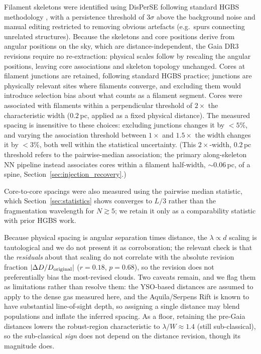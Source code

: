 \documentclass[usenatbib,twoside,twocolumn]{mnras}
\begin{document}
Filament skeletons were identified using DisPerSE \citep{Sousbie2011} following standard HGBS methodology \citep{Arzoumanian2011}, with a persistence threshold of $3\sigma$ above the background noise and manual editing restricted to removing obvious artefacts (e.g.\ spurs connecting unrelated structures). Because the skeletons and core positions derive from angular positions on the sky, which are distance-independent, the Gaia DR3 revisions require no re-extraction: physical scales follow by rescaling the angular positions, leaving core associations and skeleton topology unchanged. Cores at filament junctions are retained, following standard HGBS practice; junctions are physically relevant sites where filaments converge, and excluding them would introduce selection bias about what counts as a filament segment. Cores were associated with filaments within a perpendicular threshold of $2\times$ the characteristic width ($0.2$\,pc, applied as a fixed physical distance). The measured spacing is insensitive to these choices: excluding junctions changes it by $<5\%$, and varying the association threshold between $1\times$ and $1.5\times$ the width changes it by $<3\%$, both well within the statistical uncertainty. (This $2\times$-width, $0.2$\,pc threshold refers to the pairwise-median association; the primary along-skeleton NN pipeline instead associates cores within a filament half-width, $\sim0.06$\,pc, of a spine, Section~\ref{sec:injection_recovery}.)

Core-to-core spacings were also measured using the pairwise median statistic, which Section~\ref{sec:statistics} shows converges to $L/3$ rather than the fragmentation wavelength for $N\gtrsim5$; we retain it only as a comparability statistic with prior HGBS work.

Because physical spacing is angular separation times distance, the $\lambda\propto d$ scaling is tautological and we do not present it as corroboration; the relevant check is that the \emph{residuals} about that scaling do not correlate with the absolute revision fraction $|\Delta D/D_{\rm original}|$ ($r=0.18$, $p=0.68$), so the revision does not preferentially bias the most-revised clouds. Two caveats remain, and we flag them as limitations rather than resolve them: the YSO-based distances \citep{Zhang2023} are assumed to apply to the dense gas measured here, and the Aquila/Serpens Rift is known to have substantial line-of-sight depth, so assigning a single distance may blend populations and inflate the inferred spacing. As a floor, retaining the pre-Gaia distances lowers the robust-region characteristic to $\lambda/W\approx1.4$ (still sub-classical), so the sub-classical \emph{sign} does not depend on the distance revision, though its magnitude does.
\end{document}
